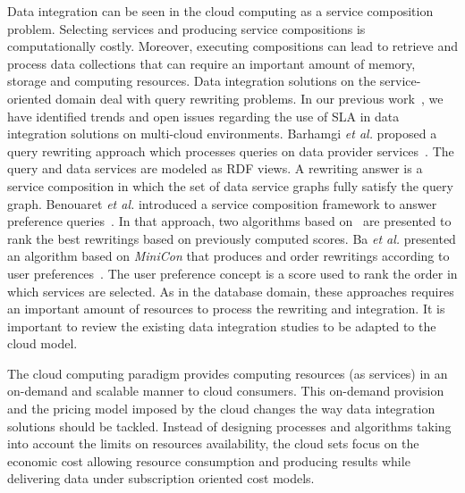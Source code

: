\documentclass[11pt,a4paper,oneside]{report}
\begin{document}
Data integration can be seen in the cloud computing as a service composition problem. Selecting services and producing service compositions is computationally costly. Moreover, executing compositions can lead to retrieve and process data collections that can require an important amount of memory, storage and computing resources. Data integration solutions on the service-oriented domain deal with query rewriting problems. In our previous work~\cite{Carvalho2015}, we have identified trends and open issues regarding the use of SLA in data integration solutions on multi-cloud environments.
%
Barhamgi \textit{et al.} proposed a query rewriting approach which processes queries on data provider services~\cite{Barhamgi2010}. The query and data services are modeled as RDF views. A rewriting answer is a service composition in which the set of data service graphs fully satisfy the query graph.  
%
Benouaret \textit{et al.} introduced a service composition framework to answer preference queries~\cite{Benouaret2011}. In that approach, two algorithms based on~\cite{Barhamgi2010} are presented to rank the best rewritings based on previously computed scores.
%
Ba \textit{et al.} presented an algorithm based on \textit{MiniCon} that produces and order rewritings according to user preferences~\cite{ba2014}. The user preference concept is a score used to rank the order in which services are selected.
%
As in the database domain, these approaches requires an important amount of resources to process the rewriting and integration. 
%
It is important to review the existing data integration studies to be adapted to the cloud model. 

The cloud computing paradigm provides computing resources (as services) in an on-demand and scalable manner to cloud consumers. This on-demand provision and the pricing model imposed by the cloud changes the way data integration solutions should be tackled. Instead of designing processes and algorithms taking into account the limits on resources availability, the cloud sets focus on the economic cost allowing resource consumption and producing results while delivering data under subscription oriented cost models.
\end{document}
